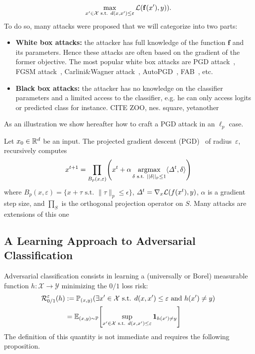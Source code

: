 \begin{align}
    \max_{x'\in\XX\text{ s.t. } d(x,x')\leq \varepsilon}\loss\left(\mathbf{f}(x'), y)\right).
\end{align}
To do so, many attacks were proposed that we will categorize into two parts: 
\begin{itemize}
    \item \textbf{White box attacks:} the attacker has  full knowledge of the function $\mathbf{f}$ and its parameters. Hence these attacks are often based on the gradient of the former objective. The most popular white box attacks are PGD attack~\cite{kurakin2016adversarial,madry2017towards}, FGSM attack~\citep{goodfellow2014explaining}, Carlini\&Wagner attack~\citep{carlini2017towards}, AutoPGD~\citep{Croce2020MinimallyDA}, FAB~\citep{Croce2020MinimallyDA}, etc.
    \item \textbf{Black box attacks:} the attacker has no knowledge on the classifier parameters and a limited access to the classifier, e.g. he can only access logits or predicted class for instance. CITE ZOO, nes. square, yetanother
    
\end{itemize}
As an illustration we show hereafter how to craft a PGD attack in an $\ell_p$ case.
\begin{example*} Let $x_0\in\mathbb{R}^d$ be an input. The projected gradient descent (PGD)~\cite{madry2017towards} of radius~$\varepsilon$, recursively computes
\begin{align*}
x^{t+1}=\prod_{B_p(x,\varepsilon)}\left(x^t
+\alpha \argmaxB_{\delta\text{ s.t. }||\delta||_p\leq1} \langle\Delta^t,\delta \rangle\right)
\end{align*}
where $B_p(x,\varepsilon) = \{ x+\tau \text{~s.t.~} \lVert\tau\rVert_p \leq \epsilon\}$, $\Delta^t=\nabla_x \loss\left(f\left(x^t\right),y\right)$, $\alpha$ is a gradient step size, and $\prod_S$ is the orthogonal projection operator on $S$. Many attacks are extensions of this one~\citep{tramer2019adversarial,Croce2020ReliableEO}
\end{example*}
\subsection{A Learning Approach to Adversarial Classification}
Adversarial classification consists in  learning a (universally or Borel) measurable function $h:\mathcal{X}\to\mathcal{Y}$ minimizing the $0/1$ loss risk: 
\begin{align*}
\risk^\varepsilon_{0/1}(h)&:=\PP_{(x,y)}(\exists x'\in\XX\text{ s.t. } d(x,x')\leq \varepsilon \text{ and } h(x')\neq y)\\
&= \EE_{(x,y)\sim\PP}\left[\sup_{x'\in\XX\text{ s.t. } d(x,x')\leq \varepsilon}\mathbf{1}_{h(x')\neq y}\right]
\end{align*}
The definition of this quantity is not immediate and requires the following proposition.

